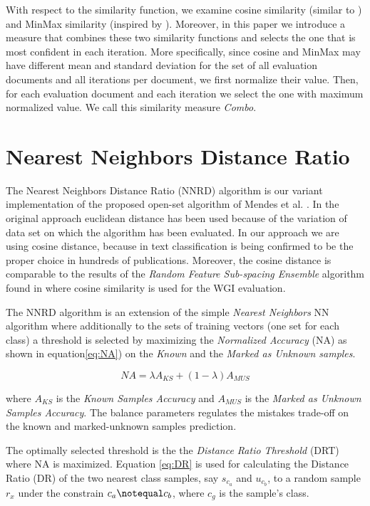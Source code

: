With respect to the similarity function, we examine cosine similarity (similar to ) and MinMax similarity (inspired by ). Moreover, in this paper we introduce a measure that combines these two similarity functions and selects the one that is most confident in each iteration. More specifically, since cosine and MinMax may have different mean and standard deviation for the set of all evaluation documents and all iterations per document, we first normalize their value. Then, for each evaluation document and each iteration we select the one with maximum normalized value. We call this similarity measure \textit{Combo}.

\section{Nearest Neighbors Distance Ratio}\label{sec:NNRD_Description}

The Nearest Neighbors Distance Ratio (NNRD) algorithm is our variant implementation of the proposed open-set algorithm of Mendes et al. \parencite{mendesjunior2016}. In the original approach euclidean distance has been used because of the variation of data set on which the algorithm has been evaluated. In our approach we are using cosine distance, because in text classification is being confirmed to be the proper choice in hundreds of publications. Moreover, the cosine distance is comparable to the results of the \textit{Random Feature Sub-spacing Ensemble} algorithm found in \parencite{pritsos2018open} where cosine similarity is used for the WGI evaluation.

The NNRD algorithm is an extension of the simple \textit{Nearest Neighbors} NN algorithm where additionally to the sets of training vectors (one set for each class) a threshold is selected by maximizing the \textit{Normalized Accuracy} (NA) as shown in equation\ref{eq:NA}) on the \textit{Known} and the \textit{Marked as Unknown samples}.

\begin{equation} \label{eq:NA}
    NA = \lambda A_{KS} + (1 - \lambda) A_{MUS}
\end{equation}

\noindent
where $A_{KS}$ is the \textit{Known Samples Accuracy} and $A_{MUS}$ is the \textit{Marked as Unknown Samples Accuracy}. The balance parameters \lambda regulates the mistakes trade-off on the known and marked-unknown samples prediction.

The optimally selected threshold is the the \textit{Distance Ratio Threshold} (DRT) where NA is maximized. Equation \ref{eq:DR} is used for calculating the Distance Ratio (DR) of the two nearest class samples, say $s_{c_{a}}$ and $u_{c_{b}}$, to a random sample $r_{x}$ under the constrain $c_{a} \notequal c_{b}$, where $c_{g}$ is the sample's class.

